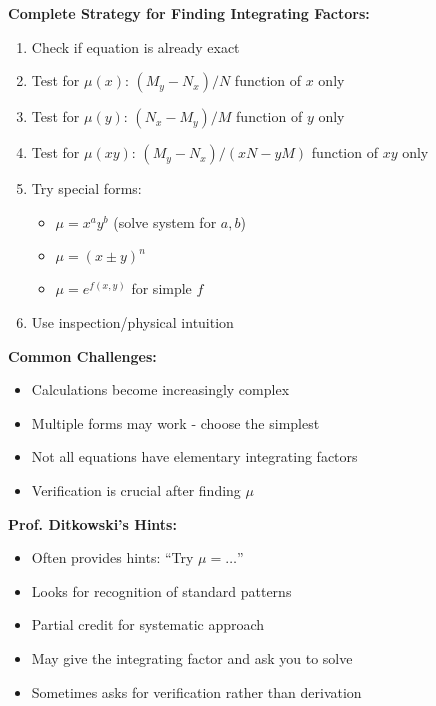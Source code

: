 \documentclass[12pt]{article}
\begin{document}
\begin{algorithm}
\textbf{Complete Strategy for Finding Integrating Factors:}
\begin{enumerate}
    \item Check if equation is already exact
    \item Test for $\mu(x)$: $(M_y - N_x)/N$ function of $x$ only
    \item Test for $\mu(y)$: $(N_x - M_y)/M$ function of $y$ only  
    \item Test for $\mu(xy)$: $(M_y - N_x)/(xN - yM)$ function of $xy$ only
    \item Try special forms:
    \begin{itemize}
        \item $\mu = x^a y^b$ (solve system for $a,b$)
        \item $\mu = (x \pm y)^n$ 
        \item $\mu = e^{f(x,y)}$ for simple $f$
    \end{itemize}
    \item Use inspection/physical intuition
\end{enumerate}
\end{algorithm}

\begin{warning}
\textbf{Common Challenges:}
\begin{itemize}
    \item Calculations become increasingly complex
    \item Multiple forms may work - choose the simplest
    \item Not all equations have elementary integrating factors
    \item Verification is crucial after finding $\mu$
\end{itemize}
\end{warning}

\begin{examtip}
\textbf{Prof. Ditkowski's Hints:}
\begin{itemize}
    \item Often provides hints: ``Try $\mu = \ldots$''
    \item Looks for recognition of standard patterns
    \item Partial credit for systematic approach
    \item May give the integrating factor and ask you to solve
    \item Sometimes asks for verification rather than derivation
\end{itemize}
\end{examtip}
\end{document}
